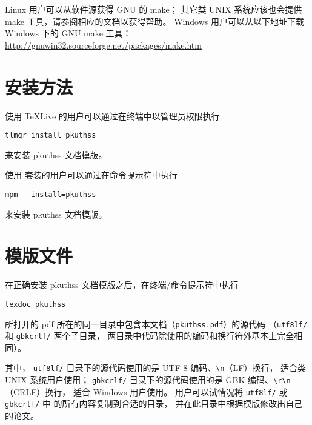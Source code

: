 	Linux 用户可以从软件源获得 GNU 的 make；
	其它类 UNIX 系统应该也会提供 make 工具，请参阅相应的文档以获得帮助。%
	Windows 用户可以从以下地址下载 Windows 下的 GNU make 工具：\\
	\hspace*{\parindent}%
	\url{http://gnuwin32.sourceforge.net/packages/make.htm}

	\section{安装方法}\label{sec:inst}

	使用 \TeX{}Live 的用户可以通过在终端中以管理员权限执行
\begin{Verbatim}[frame = single]
tlmgr install pkuthss
\end{Verbatim}
	来安装 pkuthss 文档模版。

	使用 \CTeX{} 套装的用户可以通过在命令提示符中执行
\begin{Verbatim}[frame = single]
mpm --install=pkuthss
\end{Verbatim}
	来安装 pkuthss 文档模版。

	\section{模版文件}\label{sec:doc-dir}

	在正确安装 pkuthss 文档模版之后，在终端/命令提示符中执行
\begin{Verbatim}[frame = single]
texdoc pkuthss
\end{Verbatim}
	所打开的 pdf 所在的同一目录中包含本文档（\verb|pkuthss.pdf|）的源代码%
	（\verb|utf8lf/| 和 \verb|gbkcrlf/| 两个子目录，
	两目录中代码除使用的编码和换行符外基本上完全相同）。

	其中，%
	\verb|utf8lf/| 目录下的源代码使用的是 UTF-8 编码、\verb|\n|（LF）换行，
	适合类 UNIX 系统用户使用；%
	\verb|gbkcrlf/| 目录下的源代码使用的是 GBK 编码、\verb|\r\n|（CRLF）换行，
	适合 Windows 用户使用。%
	用户可以试情况将 \verb|utf8lf/| 或 \verb|gbkcrlf/| 中
	的所有内容复制到合适的目录，
	并在此目录中根据模版修改出自己的论文。

